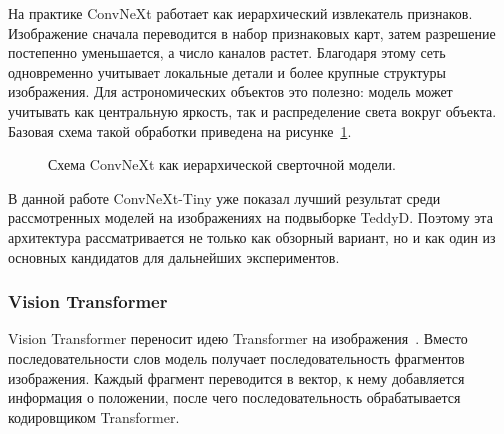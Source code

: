 \documentclass[12pt,a4paper]{article}
\begin{document}
На практике ConvNeXt работает как иерархический извлекатель признаков. Изображение сначала переводится в набор признаковых карт, затем разрешение постепенно уменьшается, а число каналов растет. Благодаря этому сеть одновременно учитывает локальные детали и более крупные структуры изображения. Для астрономических объектов это полезно: модель может учитывать как центральную яркость, так и распределение света вокруг объекта. Базовая схема такой обработки приведена на рисунке~\ref{fig:convnext-scheme}.

\begin{figure}[h]
\centering
{}
\caption{Схема ConvNeXt как иерархической сверточной модели.}
\label{fig:convnext-scheme}
\end{figure}

В данной работе ConvNeXt-Tiny уже показал лучший результат среди рассмотренных моделей на изображениях на подвыборке TeddyD. Поэтому эта архитектура рассматривается не только как обзорный вариант, но и как один из основных кандидатов для дальнейших экспериментов.

\subsubsection{Vision Transformer}

Vision Transformer переносит идею Transformer на изображения~\cite{dosovitskiy2020vit}. Вместо последовательности слов модель получает последовательность фрагментов изображения. Каждый фрагмент переводится в вектор, к нему добавляется информация о положении, после чего последовательность обрабатывается кодировщиком Transformer.
\end{document}
